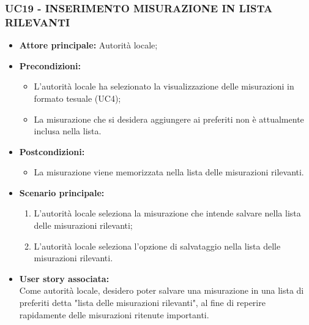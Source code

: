 \subsubsection{UC19 - INSERIMENTO MISURAZIONE IN LISTA RILEVANTI}
\begin{itemize}
    \item \textbf{Attore principale:} Autorità locale;
    \item \textbf{Precondizioni:}
          \begin{itemize}
            \item L'autorità locale ha selezionato la visualizzazione delle misurazioni in formato tesuale (UC4);
            \item La misurazione che si desidera aggiungere ai preferiti non è attualmente inclusa nella lista.
          \end{itemize}
    \item \textbf{Postcondizioni:}
          \begin{itemize}
              \item La misurazione viene memorizzata nella lista delle misurazioni rilevanti.
          \end{itemize}
    \item \textbf{Scenario principale:}
          \begin{enumerate}
            \item L'autorità locale seleziona la misurazione che intende salvare nella lista delle misurazioni rilevanti;
            \item L'autorità locale seleziona l'opzione di salvataggio nella lista delle misurazioni rilevanti.
          \end{enumerate}
    \item \textbf{User story associata:} \\
        Come autorità locale, desidero poter salvare una misurazione in una lista di preferiti detta "lista delle misurazioni rilevanti", al fine di reperire rapidamente delle misurazioni ritenute importanti.
\end{itemize}